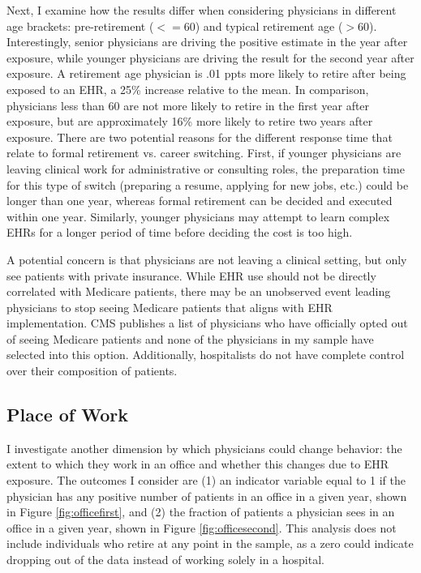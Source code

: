 \documentclass[12pt]{article}
\begin{document}
Next, I examine how the results differ when considering physicians in different age brackets: pre-retirement ($<= 60$) and typical retirement age ($> 60$). Interestingly, senior physicians are driving the positive estimate in the year after exposure, while younger physicians are driving the result for the second year after exposure. A retirement age physician is .01 ppts more likely to retire after being exposed to an EHR, a 25\% increase relative to the mean. In comparison, physicians less than 60 are not more likely to retire in the first year after exposure, but are approximately 16\% more likely to retire two years after exposure. There are two potential reasons for the different response time that relate to formal retirement vs. career switching. First, if younger physicians are leaving clinical work for administrative or consulting roles, the preparation time for this type of switch (preparing a resume, applying for new jobs, etc.) could be longer than one year, whereas formal retirement can be decided and executed within one year. Similarly, younger physicians may attempt to learn complex EHRs for a longer period of time before deciding the cost is too high. 

A potential concern is that physicians are not leaving a clinical setting, but only see patients with private insurance. While EHR use should not be directly correlated with Medicare patients, there may be an unobserved event leading physicians to stop seeing Medicare patients that aligns with EHR implementation. CMS publishes a list of physicians who have officially opted out of seeing Medicare patients and none of the physicians in my sample have selected into this option. Additionally, hospitalists do not have complete control over their composition of patients.  


\subsection{Place of Work}

I investigate another dimension by which physicians could change behavior: the extent to which they work in an office and whether this changes due to EHR exposure. The outcomes I consider are (1) an indicator variable equal to 1 if the physician has any positive number of patients in an office in a given year, shown in Figure \ref{fig:officefirst}, and (2) the fraction of patients a physician sees in an office in a given year, shown in Figure \ref{fig:officesecond}. This analysis does not include individuals who retire at any point in the sample, as a zero could indicate dropping out of the data instead of working solely in a hospital. 
\end{document}
